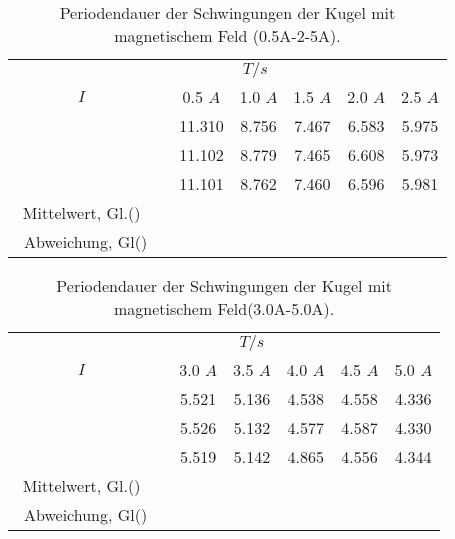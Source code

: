 
\begin{table} [H]
	\centering
	\caption{Periodendauer der Schwingungen der Kugel mit magnetischem Feld (0.5A-2-5A).}
	\label{tab:T3.1}
	\begin{tabular}{S[table-format=1.5] S S S S S S}
		\toprule
		& &  \\
		\cmidrule(lr){4-4}
		{$I$} && {0.5 $A$\;} & {1.0 $A$\;} & {1.5 $A$\;} & {2.0 $A$\;} & {2.5 $A$} \\
		\midrule
		&&11.310&8.756&7.467&6.583&5.975\\
		&&11.102&8.779&7.465&6.608&5.973\\
		&&11.101&8.762&7.460&6.596&5.981\\
		\bottomrule
		{Mittelwert, Gl.()}& & & & & &\\
		{\, Abweichung, Gl()}& & & & & &\\
	\end{tabular}
\end{table}

\begin{table} [H]
	\centering
	\caption{Periodendauer der Schwingungen der Kugel mit magnetischem Feld(3.0A-5.0A).}
	\label{tab:T3.2}
	\begin{tabular}{S[table-format=1.5] S S S S S S}
		\toprule
		& &  \\
		\cmidrule(lr){4-4}
		{$I$} && {3.0 $A$\;} & {3.5 $A$\;} & {4.0 $A$\;} & {4.5 $A$\;} & {5.0 $A$} \\
		\midrule
		&&5.521&5.136&4.538&4.558&4.336\\
		&&5.526&5.132&4.577&4.587&4.330\\
		&&5.519&5.142&4.865&4.556&4.344\\
		\bottomrule
		{Mittelwert, Gl.()}& & & & & &\\
		{\, Abweichung, Gl()}& & & & & &\\
	\end{tabular}
\end{table}
